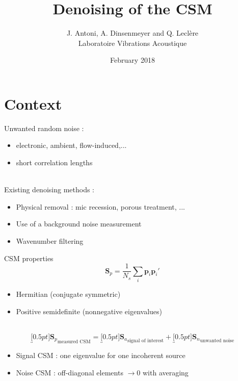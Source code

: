 \documentclass[10pt,xcolor=x11names,compress, notes=show]{beamer}%
\author{J. {Antoni}, A. {Dinsenmeyer} and Q. {Leclère} \\ Laboratoire Vibrations Acoustique}
\title{Denoising of the CSM}
\subtitle{}
\date{February 2018}
\begin{document}
\begin{frame}
	\maketitle
\end{frame}

\section{Context}
\begin{frame}{\insertsectionhead}

Unwanted random noise : 
\begin{itemize}
	\item electronic, ambient, flow-induced,...
	\item short correlation lengths
\end{itemize}
~\\
Existing denoising methods : 
\begin{itemize}
	\item Physical removal : mic recession, porous treatment, ...
	\item Use of a background noise measurement
	\item Wavenumber filtering
\end{itemize}
\end{frame}

\begin{frame}{CSM properties}
	$$\bm{S}_{p} = \frac{1}{N_s} \sum_i  \bm{p}_i\bm{p}_i'$$
	\begin{itemize}
	   	 \item Hermitian (conjugate symmetric)
	   	 \item Positive semidefinite (nonnegative eigenvalues)
	\end{itemize}~\\
	
	$$\underbracket[0.5pt]{\bm{S}_p}_{\text{measured CSM}} =\underbracket[0.5pt]{ \bm{S}_a}_{\text{signal of interest}} +\underbracket[0.5pt]{\bm{S}_n}_{\text{unwanted noise}}$$
	
	\begin{itemize}
	     \item Signal CSM : one eigenvalue for one incoherent source
	    \item Noise CSM : off-diagonal elements $\rightarrow 0$ with averaging
	\end{itemize}
\end{frame}
\end{document}
